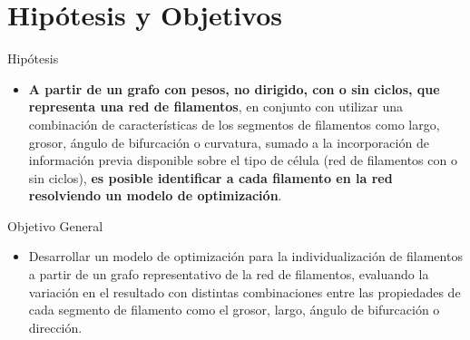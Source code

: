 \documentclass[aspectratio=169]{beamer}
\begin{document}

\section{Hip\'otesis y Objetivos}
\begin{frame}{Hip\'otesis}
\small
    \begin{itemize}
        \item {\bf A partir de un grafo con pesos, no dirigido, con o sin ciclos, que representa una red de filamentos}, en conjunto con utilizar una combinaci\'on de caracter\'isticas de los segmentos de filamentos como largo, grosor, \'angulo de bifurcaci\'on o curvatura, sumado a la incorporaci\'on de informaci\'on previa disponible sobre el tipo de c\'elula (red de filamentos con o sin ciclos), {\bf es posible identificar a cada filamento en la red resolviendo un modelo de optimizaci\'on}.
    \end{itemize}
\end{frame}

\begin{frame}{Objetivo General}
\small
    \begin{itemize}
        \item Desarrollar un modelo de optimizaci\'on para la individualizaci\'on de filamentos a partir de un grafo representativo de la red de filamentos, evaluando la variaci\'on en el resultado con distintas combinaciones entre las propiedades de cada segmento de filamento como el grosor, largo, \'angulo de bifurcaci\'on o direcci\'on.
    \end{itemize}
\end{frame}
\end{document}
